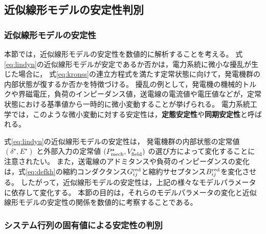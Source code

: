 \documentclass[tombow,dvipdfmx]{corona-a5-1.1}
\begin{document}
\subsection{近似線形モデルの安定性判別}

\subsubsection{近似線形モデルの安定性}

本節では，近似線形モデルの安定性を数値的に解析することを考える。
式\ref{eq:lindyn}の近似線形モデルが安定であるか否かは，電力系統に微小な擾乱が生じた場合に，
式\ref{eq:kronss}の連立方程式を満たす定常状態に向けて，発電機群の内部状態が復するか否かを特徴づける。
擾乱の例として，発電機の機械的トルクや界磁電圧，負荷のインピーダンス値，送電線の電流値や電圧値などが，定常状態における基準値から一時的に微小変動することが挙げられる。
電力系統工学では，このような微小変動に対する安定性は，\textbf{定態安定性}や\textbf{同期安定性}と呼ばれる。


式\ref{eq:lindyn}の近似線形モデルの安定性は，
発電機群の内部状態の定常値
$(\delta^{\star},E^{\star})$
と外部入力の定常値
$(P_{{\rm mech}}^{\star},V_{{\rm field}}^{\star})$
の選び方によって変化することに注意されたい。
また，送電線のアドミタンスや負荷のインピーダンスの変化は，式\ref{eq:defkh}の縮約コンダクタンス$G^{\rm red}_{ij}$と縮約サセプタンス$B^{\rm red}_{ij}$を変化させる。
したがって，近似線形モデルの安定性は，上記の様々なモデルパラメータに依存して変化する。
本節の目的は，それらのモデルパラメータの変化と近似線形モデルの安定性の関係を数値的に考察することである。

\subsubsection{システム行列の固有値による安定性の判別}
\end{document}
